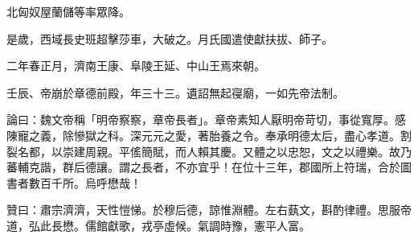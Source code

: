 \begin{pinyinscope}
北匈奴屋蘭儲等率眾降。

是歲，西域長史班超擊莎車，大破之。月氏國遣使獻扶拔、師子。

二年春正月，濟南王康、阜陵王延、中山王焉來朝。

壬辰、帝崩於章德前殿，年三十三。遺詔無起寑廟，一如先帝法制。

論曰：魏文帝稱「明帝察察，章帝長者」。章帝素知人厭明帝苛切，事從寬厚。感陳寵之義，除慘獄之科。深元元之愛，著胎養之令。奉承明德太后，盡心孝道。割裂名都，以崇建周親。平傜簡賦，而人賴其慶。又體之以忠恕，文之以禮樂。故乃蕃輔克諧，群后德讓。謂之長者，不亦宜乎！在位十三年，郡國所上符瑞，合於圖書者數百千所。烏呼懋哉！

贊曰：肅宗濟濟，天性愷悌。於穆后德，諒惟淵體。左右蓺文，斟酌律禮。思服帝道，弘此長懋。儒館獻歌，戎亭虛候。氣調時豫，憲平人富。


\end{pinyinscope}